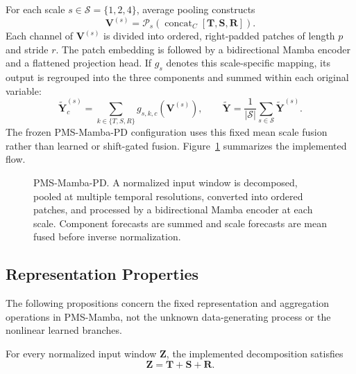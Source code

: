 For each scale $s\in\mathcal{S}=\{1,2,4\}$, average pooling constructs
\begin{equation}
    \mathbf{V}^{(s)}=\mathcal{P}_s\!\left(\operatorname{concat}_{C}[\mathbf{T},\mathbf{S},\mathbf{R}]\right).
\end{equation}
Each channel of $\mathbf{V}^{(s)}$ is divided into ordered, right-padded patches of length $p$ and stride $r$.
The patch embedding is followed by a bidirectional Mamba encoder and a flattened projection head.
If $g_s$ denotes this scale-specific mapping, its output is regrouped into the three components and summed within each original variable:
\begin{equation}
    \widetilde{\mathbf{Y}}^{(s)}_c=
    \sum_{k\in\{T,S,R\}}g_{s,k,c}(\mathbf{V}^{(s)}),
    \qquad
    \widetilde{\mathbf{Y}}=
    \frac{1}{|\mathcal{S}|}\sum_{s\in\mathcal{S}}\widetilde{\mathbf{Y}}^{(s)}.
\end{equation}
The frozen PMS-Mamba-PD configuration uses this fixed mean scale fusion rather than learned or shift-gated fusion.
Figure~\ref{fig:pms-mamba} summarizes the implemented flow.

\begin{figure}[t]
    \centering
    \resizebox{0.88\textwidth}{!}{}
    \caption{PMS-Mamba-PD. A normalized input window is decomposed, pooled at multiple temporal resolutions, converted into ordered patches, and processed by a bidirectional Mamba encoder at each scale. Component forecasts are summed and scale forecasts are mean fused before inverse normalization.}
    \label{fig:pms-mamba}
\end{figure}

\subsection{Representation Properties}

The following propositions concern the fixed representation and aggregation operations in PMS-Mamba, not the unknown data-generating process or the nonlinear learned branches.

\begin{proposition}
\label{prop:additive}
For every normalized input window $\mathbf{Z}$, the implemented decomposition satisfies
\begin{equation}
    \mathbf{Z}=\mathbf{T}+\mathbf{S}+\mathbf{R}.
\end{equation}
\end{proposition}

